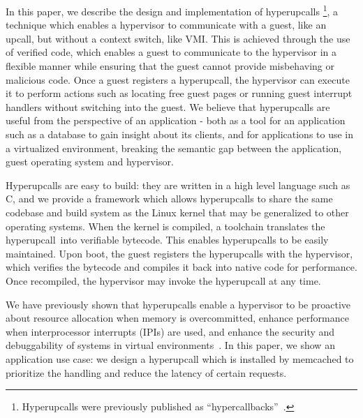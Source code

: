 \documentclass[11pt]{article}
\newcommand{\Hypercallback}{Hyperupcall\xspace{}}
\newcommand{\hypercallback}{hyperupcall\xspace{}}
\begin{document}
In this paper, we describe the design and implementation of \hypercallback{}s
\footnote{\Hypercallback{s} were previously published as
	``hypercallbacks''~\cite{amit2017hypercallbacks}.}, 
a technique which enables a hypervisor to communicate with a guest, like an upcall,
but without a context switch, like VMI. This is achieved through the use of verified
code, which enables a guest to communicate to the hypervisor in a flexible manner
while ensuring that the guest cannot provide misbehaving or malicious 
code. Once a guest registers a \hypercallback, the hypervisor can execute
it to perform actions such as locating free guest pages or running guest interrupt handlers
without switching into the guest. We believe that hyperupcalls are useful from the perspective
of an application - both as a tool for an application such as a database to gain insight about 
its clients, and for applications to use in a virtualized environment, breaking the semantic gap
between the application, guest operating system and hypervisor. 

\Hypercallback{}s are easy to build: they are written in a high level language such as C,
and we provide a 
framework which allows \hypercallback{}s to share the same codebase and 
build system as the Linux kernel that may be generalized to other operating systems. 
When the kernel is compiled, a toolchain translates the \hypercallback~into 
verifiable bytecode. This enables \hypercallback{}s to be easily maintained. 
Upon boot, the guest registers the \hypercallback{}s with the hypervisor, 
which verifies the bytecode and compiles it back into native 
code for performance. Once recompiled, the hypervisor may invoke the \hypercallback{} at any time.

We have previously shown that hyperupcalls enable a hypervisor to be proactive about resource
allocation when memory is overcommitted, enhance performance when interprocessor interrupts (IPIs)
are used, and enhance the security and debuggability of systems in virtual environments~\cite{amit2018design}.
In this paper, we show an application use case: we design a hyperupcall which is installed by
memcached to prioritize the handling and reduce the latency of certain requests. 



\end{document}
